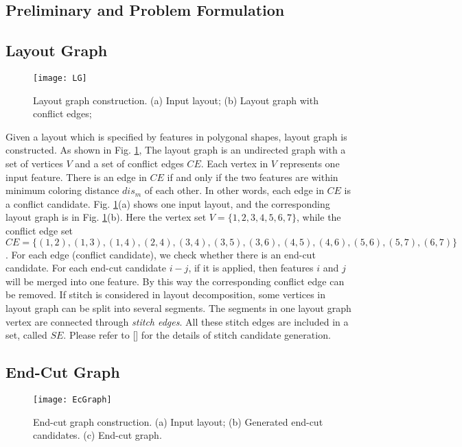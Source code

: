 \documentclass[12pt]{spieman}
\theoremstyle{plain}
\begin{document}
\begin{spacing}{1}
\section{Preliminary and Problem Formulation}
\label{sec:tplec_prelim}


\subsection{Layout Graph}

\begin{figure}[htb]
  \centering
  \texttt{[image: LG]}
  \caption{Layout graph construction.
  (a) Input layout;
  (b) Layout graph with conflict edges;
  }
  \label{fig:tplec_lg}
\end{figure}

Given a layout which is specified by features in polygonal shapes, layout graph \cite{TPL_ICCAD2011_Yu} is constructed.
As shown in Fig. \ref{fig:tplec_lg},
The layout graph is an undirected graph with a set of vertices $V$ and a set of conflict edges $CE$.
Each vertex in $V$ represents one input feature.
There is an edge in $CE$ if and only if the two features are within minimum coloring distance $dis_m$ of each other.
In other words, each edge in $CE$ is a conflict candidate.
Fig. \ref{fig:tplec_lg}(a) shows one input layout, and the corresponding layout graph is in Fig. \ref{fig:tplec_lg}(b).
Here the vertex set $V=\{1,2,3,4,5,6,7\}$,
while the conflict edge set $CE=\{(1,2),(1,3),(1,4),(2,4),(3,4),(3,5),(3,6),(4,5),(4,6),(5,6),(5,7),(6,7)\}$.
For each edge (conflict candidate), we check whether there is an end-cut candidate.
For each end-cut candidate $i-j$, if it is applied, then features $i$ and $j$ will be merged into one feature.
By this way the corresponding conflict edge can be removed.
If stitch is considered in layout decomposition, some vertices in layout graph can be split into several segments.
The segments in one layout graph vertex are connected through \textit{stitch edges}.
All these stitch edges are included in a set, called $SE$.
Please refer to [] for the details of stitch candidate generation.


\subsection{End-Cut Graph}
\label{sec:ec_graph}

\begin{figure}[htb]
  \centering
  \texttt{[image: EcGraph]}
  \caption{End-cut graph construction.
  (a) Input layout;
  (b) Generated end-cut candidates.
  (c) End-cut graph.
  }
  \label{fig:tplec_ecgraph}
\end{figure}


\end{spacing}
\end{document}
